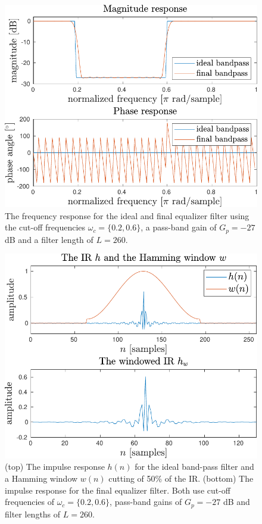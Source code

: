 \documentclass[journal]{IEEEtran}
\begin{document}
\begin{figure}
    \centering
    \includegraphics[width=\columnwidth]{assignment_02/plots/equalizer.pdf}
    \caption{The frequency response for the ideal and final equalizer filter using the cut-off frequencies $\omega_c=\{0.2,0.6\}$, a pass-band gain of $G_p=-27$ dB and a filter length of $L=260$.}
    \label{fig:eq}
\end{figure}
\begin{figure}
    \centering
    \includegraphics[width=\columnwidth]{assignment_02/plots/equalizer_ir.pdf}
    \caption{(top) The impulse response $h(n)$ for the ideal band-pass filter and a Hamming window $w(n)$ cutting of 50\% of the IR. (bottom) The impulse response for the final equalizer filter. Both use cut-off frequencies of $\omega_c=\{0.2,0.6\}$, pass-band gains of $G_p=-27$ dB and filter lengths of $L=260$.}
    \label{fig:eq_ir}
\end{figure}
\end{document}
